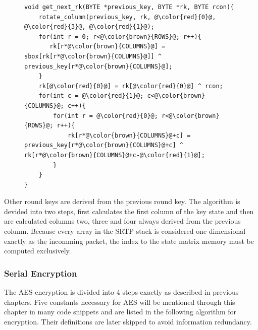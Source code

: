 \begin{figure}[H]
\begin{lstlisting}
void get_next_rk(BYTE *previous_key, BYTE *rk, BYTE rcon){
    rotate_column(previous_key, rk, @\color{red}{0}@, @\color{red}{3}@, @\color{red}{1}@);
    for(int r = 0; r<@\color{brown}{ROWS}@; r++){
       rk[r*@\color{brown}{COLUMNS}@] = sbox[rk[r*@\color{brown}{COLUMNS}@]] ^ previous_key[r*@\color{brown}{COLUMNS}@]; 
    }
    rk[@\color{red}{0}@] = rk[@\color{red}{0}@] ^ rcon;
    for(int c = @\color{red}{1}@; c<@\color{brown}{COLUMNS}@; c++){
        for(int r = @\color{red}{0}@; r<@\color{brown}{ROWS}@; r++){
            rk[r*@\color{brown}{COLUMNS}@+c] = previous_key[r*@\color{brown}{COLUMNS}@+c] ^ rk[r*@\color{brown}{COLUMNS}@+c-@\color{red}{1}@];
        }
    }
}
\end{lstlisting}
\end{figure}
Other round keys are derived from the previous round key. The algorithm is 
devided into two steps, first calculates the first column of the key state
and then are calculated columns two, three and four always derived from
the previous column. Because every array in the SRTP stack is considered
one dimensional exactly as the incomming packet, the index to the state matrix
memory must be computed exclusively.

\subsubsection*{Serial Encryption}
The AES encryption is divided into 4 steps exactly as described in previous
chapters. Five constants necessary for AES will be mentioned through this 
chapter in many code snippets and are listed in the following algorithm for 
encryption. Their definitions are later skipped to avoid information redundancy.

